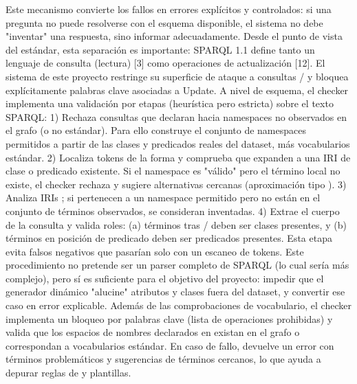 {}Este mecanismo convierte los fallos en errores explícitos y controlados: si una pregunta no puede resolverse con el esquema disponible, el sistema no debe "inventar" una respuesta, sino informar adecuadamente.\markdownRendererInterblockSeparator
{}Desde el punto de vista del estándar, esta separación es importante: SPARQL 1.1 define tanto un lenguaje de consulta (lectura) [3] como operaciones de actualización [12]. El sistema de este proyecto restringe su superficie de ataque a consultas / y bloquea explícitamente palabras clave asociadas a Update.\markdownRendererInterblockSeparator
{}A nivel de esquema, el checker implementa una validación por etapas (heurística pero estricta) sobre el texto SPARQL:\markdownRendererInterblockSeparator
{}1)  Rechaza consultas que declaran  hacia namespaces no observados en el grafo (o no estándar). Para ello construye el conjunto de namespaces permitidos a partir de las clases y predicados reales del dataset, más vocabularios estándar. 2)  Localiza tokens de la forma  y comprueba que expanden a una IRI de clase o predicado existente. Si el namespace es "válido" pero el término local no existe, el checker rechaza y sugiere alternativas cercanas (aproximación tipo ). 3)  Analiza IRIs ; si pertenecen a un namespace permitido pero no están en el conjunto de términos observados, se consideran inventadas. 4)  Extrae el cuerpo de la consulta y valida roles: (a) términos tras / deben ser clases presentes, y (b) términos en posición de predicado deben ser predicados presentes. Esta etapa evita falsos negativos que pasarían solo con un escaneo de tokens.\markdownRendererInterblockSeparator
{}Este procedimiento no pretende ser un parser completo de SPARQL (lo cual sería más complejo), pero sí es suficiente para el objetivo del proyecto: impedir que el generador dinámico "alucine" atributos y clases fuera del dataset, y convertir ese caso en error explicable.\markdownRendererInterblockSeparator
{}Además de las comprobaciones de vocabulario, el checker implementa un bloqueo por palabras clave (lista de operaciones prohibidas) y valida que los espacios de nombres declarados en  existan en el grafo o correspondan a vocabularios estándar. En caso de fallo, devuelve un error con términos problemáticos y sugerencias de términos cercanos, lo que ayuda a depurar reglas de  y plantillas.\markdownRendererInterblockSeparator
